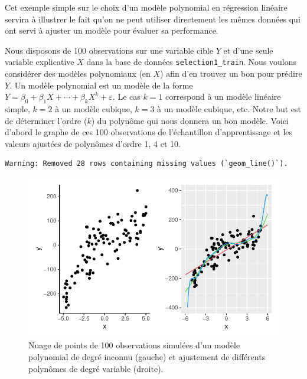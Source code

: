 \documentclass[
  11pt,
  letterpaper,
]{scrbook}
\theoremstyle{definition}
\theoremstyle{remark}
\begin{document}
Cet exemple simple sur le choix d'un modèle polynomial en régression
linéaire servira à illustrer le fait qu'on ne peut utiliser directement
les mêmes données qui ont servi à ajuster un modèle pour évaluer sa
performance.

Nous disposons de 100 observations sur une variable cible \(Y\) et d'une
seule variable explicative \(X\) dans la base de données
\texttt{selection1\_train}. Nous voulons considérer des modèles
polynomiaux (en \(X\)) afin d'en trouver un bon pour prédire \(Y\). Un
modèle polynomial est un modèle de la forme
\(Y=\beta_0 + \beta_1X+\cdots+\beta_kX^k+\varepsilon\). Le cas \(k=1\)
correspond à un modèle linéaire simple, \(k=2\) à un modèle cubique,
\(k=3\) à un modèle cubique, etc. Notre but est de déterminer l'ordre
(\(k\)) du polynôme qui nous donnera un bon modèle. Voici d'abord le
graphe de ces 100 observations de l'échantillon d'apprentissage et les
valeurs ajustées de polynômes d'ordre 1, 4 et 10.

\begin{verbatim}
Warning: Removed 28 rows containing missing values (`geom_line()`).
\end{verbatim}

\begin{figure}[ht!]

{\centering \includegraphics[width=1\textwidth,height=\textheight]{./04-selectionmodeles_files/figure-pdf/fig-donneestest-1.pdf}

}

\caption{\label{fig-donneestest}Nuage de points de 100 observations
simulées d'un modèle polynomial de degré inconnu (gauche) et ajustement
de différents polynômes de degré variable (droite).}

\end{figure}
\end{document}
